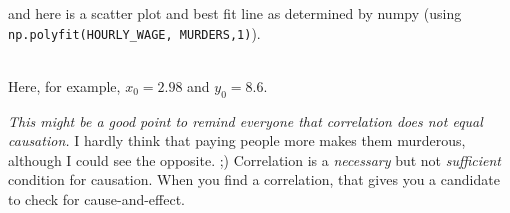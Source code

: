 \begin{fullwidth}
\noindent and here is a scatter plot and best fit line as determined by numpy (using {\tt\footnotesize np.polyfit(HOURLY\_WAGE, MURDERS,1)}).

\\

\noindent Here, for example, $x_0 = 2.98$ and $y_0 = 8.6$.

{\em This might be a good point to remind everyone that correlation does not equal causation.}  I hardly think that paying people more makes them murderous, although I could see the opposite. ;)  Correlation is a {\em necessary} but not {\em sufficient} condition for causation. When you find a correlation, that gives you a candidate to check for cause-and-effect.


\end{fullwidth}
